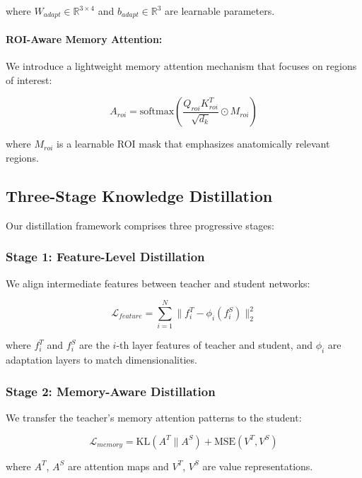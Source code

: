 \documentclass[conference]{IEEEtran}
\begin{document}
where $W_{adapt} \in \mathbb{R}^{3 \times 4}$ and $b_{adapt} \in \mathbb{R}^{3}$ are learnable parameters.

\paragraph{ROI-Aware Memory Attention:} We introduce a lightweight memory attention mechanism that focuses on regions of interest:

\begin{equation}
A_{roi} = \text{softmax}\left(\frac{Q_{roi} K_{roi}^T}{\sqrt{d_k}} \odot M_{roi}\right)
\end{equation}

where $M_{roi}$ is a learnable ROI mask that emphasizes anatomically relevant regions.

\subsection{Three-Stage Knowledge Distillation}

Our distillation framework comprises three progressive stages:

\subsubsection{Stage 1: Feature-Level Distillation}

We align intermediate features between teacher and student networks:

\begin{equation}
\mathcal{L}_{feature} = \sum_{i=1}^{N} \| f_i^T - \phi_i(f_i^S) \|_2^2
\end{equation}

where $f_i^T$ and $f_i^S$ are the $i$-th layer features of teacher and student, and $\phi_i$ are adaptation layers to match dimensionalities.

\subsubsection{Stage 2: Memory-Aware Distillation}

We transfer the teacher's memory attention patterns to the student:

\begin{equation}
\mathcal{L}_{memory} = \text{KL}(A^T \| A^S) + \text{MSE}(V^T, V^S)
\end{equation}

where $A^T$, $A^S$ are attention maps and $V^T$, $V^S$ are value representations.
\end{document}
